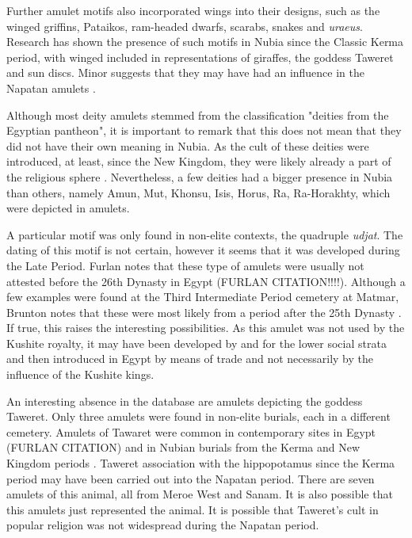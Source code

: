 Further amulet motifs also incorporated wings into their designs, such as the winged griffins, Pataikos, ram-headed dwarfs, scarabs, snakes and \textit{uraeus}. Research has shown the presence of such motifs in Nubia since the Classic Kerma period, with winged included in representations of giraffes, the goddess Taweret and sun discs. Minor suggests that they may have had an influence in the Napatan amulets \parencites[p.~200-201]{minorUseEgyptianEgyptianizing2012}.


Although most deity amulets stemmed from the classification "deities from the Egyptian pantheon", it is important to remark that this does not mean that they did not have their own meaning in Nubia. As the cult of these deities were introduced, at least, since the New Kingdom, they were likely already a part of the religious sphere \parencite[p.~29]{kuckertzEinführungReligionKusch2016}. Nevertheless, a few deities had a bigger presence in Nubia than others, namely Amun, Mut, Khonsu, Isis, Horus, Ra, Ra-Horakhty, which were depicted in amulets. 


A particular motif was only found in non-elite contexts, the quadruple \textit{udjat}. The dating of this motif is not certain, however it seems that it was developed during the Late Period. Furlan notes that these type of amulets were usually not attested before the 26th Dynasty in Egypt (FURLAN CITATION!!!!). Although a few examples were found at the Third Intermediate Period cemetery at Matmar, Brunton notes that these were most likely from a period after the 25th Dynasty \parencite[p.~82]{bruntonMatmarBritishMuseum1948}. If true, this raises the interesting possibilities. As this amulet was not used by the Kushite royalty, it may have been developed by and for the lower social strata and then introduced in Egypt by means of trade and not necessarily by the influence of the Kushite kings.


An interesting absence in the database are amulets depicting the goddess Taweret. Only three amulets were found in non-elite burials, each in a different cemetery. Amulets of Tawaret were common in contemporary sites in Egypt (FURLAN CITATION)\parencites[p.~60-61]{massonScarabsScaraboidsAmulets2015}{bibid} and in Nubian burials from the Kerma and New Kingdom periods \parencites[p.~145]{minorUseEgyptianEgyptianizing2012}[p.~163-165]{lemosForeignObjectsLocal2020}. Taweret association with the hippopotamus since the Kerma period may have been carried out into the Napatan period. There are seven amulets of this animal, all from Meroe West and Sanam. It is also possible that this amulets just represented the animal. It is possible that Taweret's cult in popular religion was not widespread during the Napatan period.


